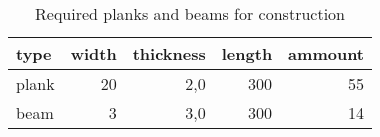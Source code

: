 \begin{table}[h!]
\centering
\caption{Required planks and beams for construction}
\begin{tabular}{lrrrr}
\toprule
 type &  width &  thickness &  length &  ammount \\
\midrule
plank &     20 &        2,0 &     300 &       55 \\
 beam &      3 &        3,0 &     300 &       14 \\
\bottomrule
\end{tabular}
\end{table}
